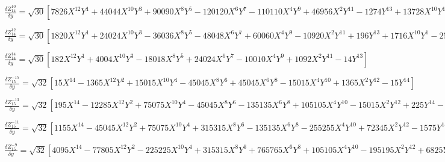 \documentclass[10pt,landscape]{article}
\begin{document}
\vspace{1.2 mm}
\noindent $ \frac{\delta Z^{10}_{14}}{\delta y} = \sqrt{30} [7826X^{12}Y^{1} +44044X^{10}Y^{3} +90090X^{8}Y^{5} -120120X^{6}Y^{7} -110110X^{4}Y^{9} +46956X^{2}Y^{11} -1274Y^{13} +13728X^{10}Y^{1} -102960X^{8}Y^{3} +205920X^{4}Y^{7} -68640X^{2}Y^{9} +1872Y^{11} -5940X^{8}Y^{1} +55440X^{6}Y^{3} -83160X^{4}Y^{5} +23760X^{2}Y^{7} -660Y^{9}] $

\vspace{1.2 mm}
\noindent $ \frac{\delta Z^{12}_{14}}{\delta y} = \sqrt{30} [1820X^{12}Y^{1} +24024X^{10}Y^{3} -36036X^{8}Y^{5} -48048X^{6}Y^{7} +60060X^{4}Y^{9} -10920X^{2}Y^{11} +196Y^{13} +1716X^{10}Y^{1} -25740X^{8}Y^{3} +72072X^{6}Y^{5} -51480X^{4}Y^{7} +8580X^{2}Y^{9} -156Y^{11}] $

\vspace{1.2 mm}
\noindent $ \frac{\delta Z^{14}_{14}}{\delta y} = \sqrt{30} [182X^{12}Y^{1} +4004X^{10}Y^{3} -18018X^{8}Y^{5} +24024X^{6}Y^{7} -10010X^{4}Y^{9} +1092X^{2}Y^{11} -14Y^{13}] $

\vspace{1.2 mm}
\noindent $ \frac{\delta Z^{-15}_{15}}{\delta y} = \sqrt{32} [15X^{14} -1365X^{12}Y^{2} +15015X^{10}Y^{4} -45045X^{8}Y^{6} +45045X^{6}Y^{8} -15015X^{4}Y^{10} +1365X^{2}Y^{12} -15Y^{14}] $

\vspace{1.2 mm}
\noindent $ \frac{\delta Z^{-13}_{15}}{\delta y} = \sqrt{32} [195X^{14} -12285X^{12}Y^{2} +75075X^{10}Y^{4} -45045X^{8}Y^{6} -135135X^{6}Y^{8} +105105X^{4}Y^{10} -15015X^{2}Y^{12} +225Y^{14} -182X^{12} +12012X^{10}Y^{2} -90090X^{8}Y^{4} +168168X^{6}Y^{6} -90090X^{4}Y^{8} +12012X^{2}Y^{10} -182Y^{12}] $

\vspace{1.2 mm}
\noindent $ \frac{\delta Z^{-11}_{15}}{\delta y} = \sqrt{32} [1155X^{14} -45045X^{12}Y^{2} +75075X^{10}Y^{4} +315315X^{8}Y^{6} -135135X^{6}Y^{8} -255255X^{4}Y^{10} +72345X^{2}Y^{12} -1575Y^{14} -2002X^{12} +84084X^{10}Y^{2} -270270X^{8}Y^{4} -168168X^{6}Y^{6} +450450X^{4}Y^{8} -108108X^{2}Y^{10} +2366Y^{12} +858X^{10} -38610X^{8}Y^{2} +180180X^{6}Y^{4} -180180X^{4}Y^{6} +38610X^{2}Y^{8} -858Y^{10}] $

\vspace{1.2 mm}
\noindent $ \frac{\delta Z^{-9}_{15}}{\delta y} = \sqrt{32} [4095X^{14} -77805X^{12}Y^{2} -225225X^{10}Y^{4} +315315X^{8}Y^{6} +765765X^{6}Y^{8} +105105X^{4}Y^{10} -195195X^{2}Y^{12} +6825Y^{14} -9828X^{12} +216216X^{10}Y^{2} +180180X^{8}Y^{4} -1009008X^{6}Y^{6} -540540X^{4}Y^{8} +408408X^{2}Y^{10} -14196Y^{12} +7722X^{10} -193050X^{8}Y^{2} +180180X^{6}Y^{4} +540540X^{4}Y^{6} -270270X^{2}Y^{8} +9438Y^{10} -1980X^{8} +55440X^{6}Y^{2} -138600X^{4}Y^{4} +55440X^{2}Y^{6} -1980Y^{8}] $
\end{document}
